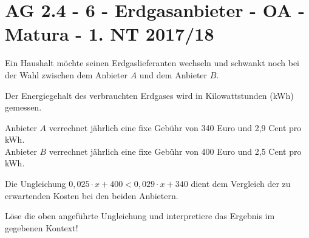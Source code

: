 \section{AG 2.4 - 6 - Erdgasanbieter - OA - Matura - 1. NT 2017/18}

\begin{beispiel}[AG 2.4]{1}
Ein Haushalt möchte seinen Erdgaslieferanten wechseln und schwankt noch bei der Wahl zwischen dem Anbieter $A$ und dem Anbieter $B$.

Der Energiegehalt des verbrauchten Erdgases wird in Kilowattstunden (kWh) gemessen.

Anbieter $A$ verrechnet jährlich eine fixe Gebühr von 340 Euro und 2,9 Cent pro kWh.\\
Anbieter $B$ verrechnet jährlich eine fixe Gebühr von 400 Euro und 2,5 Cent pro kWh.

Die Ungleichung $0,025\cdot x+400<0,029\cdot x+340$ dient dem Vergleich der zu erwartenden Kosten bei den beiden Anbietern.

Löse die oben angeführte Ungleichung und interpretiere das Ergebnis im gegebenen Kontext!

\end{beispiel}